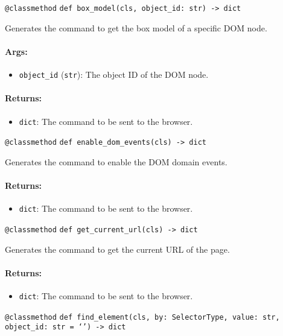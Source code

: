 \documentclass{article}
\begin{document}
\noindent\texttt{@classmethod}
\noindent\texttt{def box\_model(cls, object\_id: str) -> dict}

\noindent Generates the command to get the box model of a specific DOM node.

\paragraph{Args:}
\begin{itemize}
    \item \texttt{object\_id} (\texttt{str}): The object ID of the DOM node.
\end{itemize}

\paragraph{Returns:}
\begin{itemize}
    \item \texttt{dict}: The command to be sent to the browser.
\end{itemize}

\noindent\texttt{@classmethod}
\noindent\texttt{def enable\_dom\_events(cls) -> dict}

\noindent Generates the command to enable the DOM domain events.

\paragraph{Returns:}
\begin{itemize}
    \item \texttt{dict}: The command to be sent to the browser.
\end{itemize}

\noindent\texttt{@classmethod}
\noindent\texttt{def get\_current\_url(cls) -> dict}

\noindent Generates the command to get the current URL of the page.

\paragraph{Returns:}
\begin{itemize}
    \item \texttt{dict}: The command to be sent to the browser.
\end{itemize}

\noindent\texttt{@classmethod}
\noindent\texttt{def find\_element(cls, by: SelectorType, value: str, object\_id: str = `') -> dict}
\end{document}
